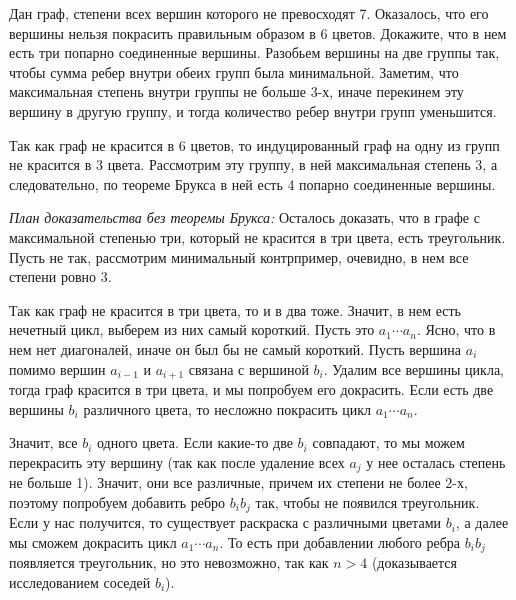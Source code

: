 \problem{}
Дан граф, степени всех вершин которого не превосходят 7.
Оказалось, что его вершины нельзя покрасить правильным образом в 6 цветов.
Докажите, что в нем есть три попарно соединенные вершины.
\solution
Разобьем вершины на две группы так, чтобы сумма ребер внутри обеих групп была
минимальной.
Заметим, что максимальная степень внутри группы не больше 3-х, иначе перекинем
эту вершину в другую группу, и тогда количество ребер внутри групп уменьшится. 
\par
Так как граф не красится в 6 цветов, то индуцированный граф на одну из групп не
красится в 3 цвета. 
Рассмотрим эту группу, в ней максимальная степень 3, а следовательно, по
теореме Брукса в ней есть 4 попарно соединенные вершины.
\par
\emph{План доказательства без теоремы Брукса:}
Осталось доказать, что в графе с максимальной степенью три, который не красится
в три цвета, есть треугольник.
Пусть не так, рассмотрим минимальный контрпример, очевидно, в нем все степени
ровно 3.
\par
Так как граф не красится в три цвета, то и в два тоже.
Значит, в нем есть нечетный цикл, выберем из них самый короткий.
Пусть это $a_1 \cdots a_n$.
Ясно, что в нем нет диагоналей, иначе он был бы не самый короткий.
Пусть вершина $a_i$ помимо вершин $a_{i-1}$ и $a_{i+1}$ связана с вершиной
$b_i$. Удалим все вершины цикла, тогда граф красится в три цвета, и мы
попробуем его докрасить.
Если есть две вершины $b_i$ различного цвета, то несложно покрасить цикл
$a_1\cdots a_n$.
\par
Значит, все $b_i$ одного цвета.
Если какие-то две $b_i$ совпадают, то мы можем перекрасить эту вершину
(так как после удаление всех $a_j$ у нее осталась степень не больше 1).
Значит, они все различные, причем их степени не более $2$-х, поэтому попробуем
добавить ребро $b_i b_j$ так, чтобы не появился треугольник.
Если у нас получится, то существует раскраска с различными цветами $b_i$, а
далее мы сможем докрасить цикл $a_1 \cdots a_n$.
То есть при добавлении любого ребра $b_i b_j$ появляется треугольник, но это
невозможно, так как $n > 4$ (доказывается исследованием соседей $b_i$).
\endproblem
